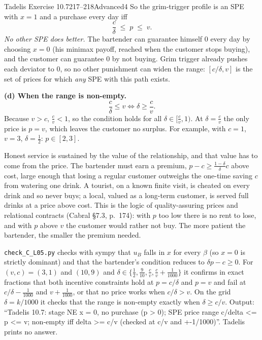 \begin{exsol}{Tadelis Exercise 10.7}{217--218}{Advanced}{4}
So the grim-trigger profile is an SPE with $x = 1$ and a purchase every day iff
\[
  \frac{c}{\delta} \;\le\; p \;\le\; v .
\]
\emph{No other SPE does better.} The bartender can guarantee himself $0$ every day by choosing
$x = 0$ (his minimax payoff, reached when the customer stops buying), and the customer can guarantee
$0$ by not buying. Grim trigger already pushes each deviator to $0$, so no other punishment can widen
the range: $[c/\delta, v]$ is the set of prices for which \emph{any} SPE with this path exists.

\textbf{(d) When the range is non-empty.}
\[
  \frac{c}{\delta} \le v \iff \delta \ge \frac{c}{v} .
\]
Because $v > c$, $\frac{c}{v} < 1$, so the condition holds for all $\delta \in [\frac{c}{v}, 1)$. At
$\delta = \frac{c}{v}$ the only price is $p = v$, which leaves the customer no surplus. For example,
with $c = 1$, $v = 3$, $\delta = \frac12$: $p \in [2, 3]$.

\interp Honest service is sustained by the value of the relationship, and that value has to come from
the price. The bartender must earn a premium, $p - c \ge \frac{1-\delta}{\delta}c$ above cost, large
enough that losing a regular customer outweighs the one-time saving $c$ from watering one drink. A
tourist, on a known finite visit, is cheated on every drink and so never buys; a local, valued as a
long-term customer, is served full drinks at a price above cost. This is the logic of
quality-assuring prices and relational contracts (Cabral \S7.3, p.~174): with $p$ too low there is
no rent to lose, and with $p$ above $v$ the customer would rather not buy. The more patient the
bartender, the smaller the premium needed.

\verify \texttt{check\_C\_L05.py} checks with sympy that $u_B$ falls in $x$ for every $\beta$ (so $x = 0$
is strictly dominant) and that the bartender's condition reduces to $\delta p - c \ge 0$. For
$(v,c) = (3,1)$ and $(10,9)$ and $\delta \in \{\frac12, \frac9{10}, \frac{c}{v}, \frac{c}{v} +
\frac1{1000}\}$ it confirms in exact fractions that both incentive constraints hold at $p = c/\delta$
and $p = v$ and fail at $c/\delta - \frac1{1000}$ and $v + \frac1{1000}$, or that no price works when
$c/\delta > v$. On the grid $\delta = k/1000$ it checks that the range is non-empty exactly when
$\delta \ge c/v$. Output: ``Tadelis 10.7: stage NE x = 0, no purchase (p > 0); SPE price range c/delta
<= p <= v; non-empty iff delta >= c/v (checked at c/v and +-1/1000)''. Tadelis prints no answer.


\end{exsol}
